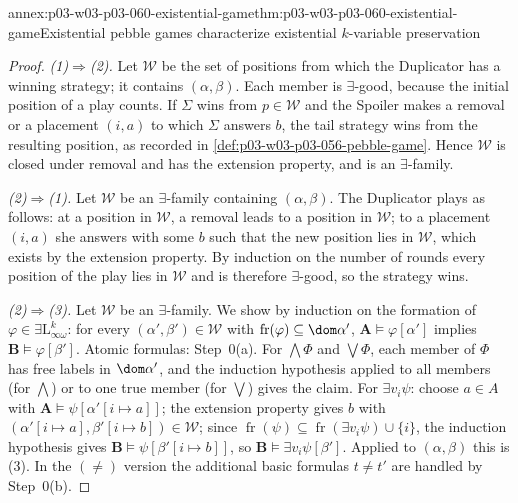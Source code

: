 \begin{annexitem}{annex:p03-w03-p03-060-existential-game}{thm:p03-w03-p03-060-existential-game}{Existential pebble games characterize existential \(k\)-variable preservation}
\begin{proof}
\emph{(1)\(\Rightarrow\)(2).} Let \(\mathcal W\) be the set of positions
from which the Duplicator has a winning strategy; it contains
\((\alpha,\beta)\). Each member is \(\exists\)-good, because the initial
position of a play counts. If \(\Sigma\) wins from \(p\in\mathcal W\) and the
Spoiler makes a removal or a placement \((i,a)\) to which \(\Sigma\) answers
\(b\), the tail strategy wins from the resulting position, as recorded in
\cref{def:p03-w03-p03-056-pebble-game}. Hence \(\mathcal W\) is closed
under removal and has the extension property, and is an \(\exists\)-family.

\emph{(2)\(\Rightarrow\)(1).} Let \(\mathcal W\) be an \(\exists\)-family
containing \((\alpha,\beta)\). The Duplicator plays as follows: at a
position in \(\mathcal W\), a removal leads to a position in
\(\mathcal W\); to a placement \((i,a)\) she answers with some \(b\) such
that the new position lies in \(\mathcal W\), which exists by the extension
property. By induction on the number of rounds every position of the play
lies in \(\mathcal W\) and is therefore \(\exists\)-good, so the strategy
wins.

\emph{(2)\(\Rightarrow\)(3).} Let \(\mathcal W\) be an \(\exists\)-family.
We show by induction on the formation of
\(\varphi\in\exists\mathrm{L}^k_{\infty\omega}\): for every
\((\alpha',\beta')\in\mathcal W\) with
\(\operatorname{fr}(\varphi)\subseteq\dom\alpha'\),
\(\mathbf A\models\varphi[\alpha']\) implies
\(\mathbf B\models\varphi[\beta']\). Atomic formulas: Step~0(a). For
\(\bigwedge\Phi\) and \(\bigvee\Phi\), each member of \(\Phi\) has free
labels in \(\dom\alpha'\), and the induction hypothesis applied to all
members (for \(\bigwedge\)) or to one true member (for \(\bigvee\)) gives
the claim. For \(\exists v_i\psi\): choose \(a\in A\) with
\(\mathbf A\models\psi[\alpha'[i\mapsto a]]\); the extension property gives
\(b\) with \((\alpha'[i\mapsto a],\beta'[i\mapsto b])\in\mathcal W\); since
\(\operatorname{fr}(\psi)\subseteq\operatorname{fr}(\exists v_i\psi)\cup\{i\}\),
the induction hypothesis gives \(\mathbf B\models\psi[\beta'[i\mapsto b]]\),
so \(\mathbf B\models\exists v_i\psi[\beta']\). Applied to
\((\alpha,\beta)\) this is (3). In the \((\neq)\) version the additional
basic formulas \(t\neq t'\) are handled by Step~0(b).


\end{proof}
\end{annexitem}
